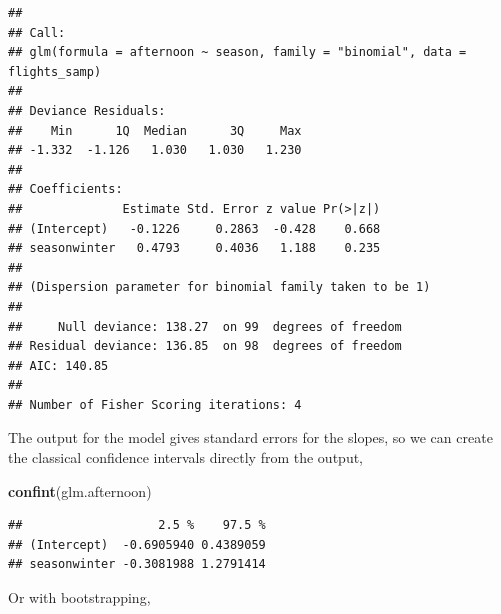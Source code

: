 \documentclass[]{book}
\newenvironment{Shaded}{\begin{snugshade}}{\end{snugshade}}
\newcommand{\CommentTok}[1]{\textcolor[rgb]{0.56,0.35,0.01}{\textit{#1}}}
\newcommand{\DataTypeTok}[1]{\textcolor[rgb]{0.13,0.29,0.53}{#1}}
\newcommand{\DecValTok}[1]{\textcolor[rgb]{0.00,0.00,0.81}{#1}}
\newcommand{\KeywordTok}[1]{\textcolor[rgb]{0.13,0.29,0.53}{\textbf{#1}}}
\newcommand{\NormalTok}[1]{#1}
\newcommand{\OperatorTok}[1]{\textcolor[rgb]{0.81,0.36,0.00}{\textbf{#1}}}
\newcommand{\OtherTok}[1]{\textcolor[rgb]{0.56,0.35,0.01}{#1}}
\newcommand{\StringTok}[1]{\textcolor[rgb]{0.31,0.60,0.02}{#1}}
\begin{document}
\begin{verbatim}
## 
## Call:
## glm(formula = afternoon ~ season, family = "binomial", data = flights_samp)
## 
## Deviance Residuals: 
##    Min      1Q  Median      3Q     Max  
## -1.332  -1.126   1.030   1.030   1.230  
## 
## Coefficients:
##              Estimate Std. Error z value Pr(>|z|)
## (Intercept)   -0.1226     0.2863  -0.428    0.668
## seasonwinter   0.4793     0.4036   1.188    0.235
## 
## (Dispersion parameter for binomial family taken to be 1)
## 
##     Null deviance: 138.27  on 99  degrees of freedom
## Residual deviance: 136.85  on 98  degrees of freedom
## AIC: 140.85
## 
## Number of Fisher Scoring iterations: 4
\end{verbatim}

The output for the model gives standard errors for the slopes, so we can create the classical confidence intervals directly from the output,

\begin{Shaded}
\begin{Highlighting}[]
\KeywordTok{confint}\NormalTok{(glm.afternoon)}
\end{Highlighting}
\end{Shaded}

\begin{verbatim}
##                   2.5 %    97.5 %
## (Intercept)  -0.6905940 0.4389059
## seasonwinter -0.3081988 1.2791414
\end{verbatim}

Or with bootstrapping,

\begin{Shaded}
\end{Shaded}
\end{document}
